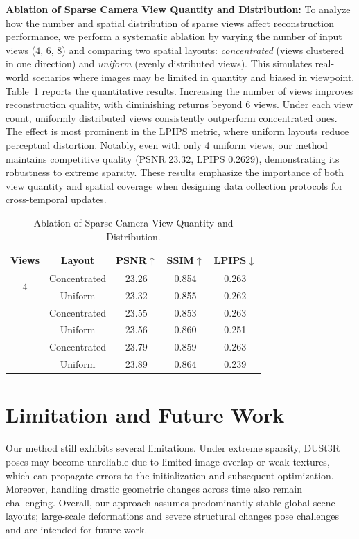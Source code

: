 \documentclass[letterpaper]{article} %
\begin{document}
\textbf{Ablation of Sparse Camera View Quantity and Distribution:} To analyze how the number and spatial distribution of sparse views affect reconstruction performance, we perform a systematic ablation by varying the number of input views ($4$, $6$, $8$) and comparing two spatial layouts: \textit{concentrated} (views clustered in one direction) and \textit{uniform} (evenly distributed views). This simulates real-world scenarios where images may be limited in quantity and biased in viewpoint. Table~\ref{tab:view_ablation} reports the quantitative results. Increasing the number of views improves reconstruction quality, with diminishing returns beyond 6 views. Under each view count, uniformly distributed views consistently outperform concentrated ones. The effect is most prominent in the LPIPS metric, where uniform layouts reduce perceptual distortion. Notably, even with only 4 uniform views, our method maintains competitive quality (PSNR 23.32, LPIPS 0.2629), demonstrating its robustness to extreme sparsity. These results emphasize the importance of both view quantity and spatial coverage when designing data collection protocols for cross-temporal updates.

\begin{table}[t]
\centering

\label{tab:view_ablation}
\begin{tabular}{c|c|ccc}
\toprule
\textbf{Views} & \textbf{Layout} & \textbf{PSNR}$\uparrow$ & \textbf{SSIM}$\uparrow$ & \textbf{LPIPS}$\downarrow$ \\
\midrule
\multirow{2}{*}{4} 
 & Concentrated  & 23.26 & 0.854 & 0.263 \\
 & Uniform  & 23.32 & 0.855 & 0.262 \\
\addlinespace
\multirow{2}{*}{6} 
 & Concentrated  & 23.55 & 0.853 & 0.263 \\
 & Uniform  & 23.56 & 0.860 & 0.251 \\
\addlinespace
\multirow{2}{*}{8} 
 & Concentrated & 23.79 & 0.859 & 0.263 \\
 & Uniform  & 23.89 & 0.864 & 0.239 \\

\bottomrule
\end{tabular}
\caption{Ablation of Sparse Camera View Quantity and Distribution.}
\label{tab:view_ablation}
\end{table}


\section{Limitation and Future Work}
Our method still exhibits several limitations. Under extreme sparsity, DUSt3R poses may become unreliable due to limited image overlap or weak textures, which can propagate errors to the initialization and subsequent optimization. Moreover, handling drastic geometric changes across time also remain challenging. Overall, our approach assumes predominantly stable global scene layouts; large-scale deformations and severe structural changes pose challenges and are intended for future work.
\end{document}
